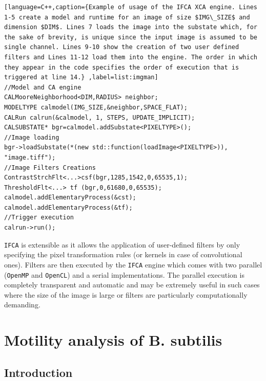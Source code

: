 \documentclass[conference]{IEEEtran}
\begin{document}
\lstset{
frame=single,
numberstyle=\ttfamily\footnotesize,
numbers=right
}
\begin{lstlisting}[language=C++,caption={Example of usage of the IFCA XCA engine. Lines 1-5 create a model and runtime for an image of size $IMG\_SIZE$ and dimension $DIM$. Lines 7 loads the image into the substate which, for the sake of brevity, is unique since the input image is assumed to be single channel. Lines 9-10 show the creation of two user defined filters and Lines 11-12 load them into the engine. The order in which they appear in the code specifies the order of execution that is triggered at line 14.} ,label=list:imgman]	
//Model and CA engine
CALMooreNeighborhood<DIM,RADIUS> neighbor;
MODELTYPE calmodel(IMG_SIZE,&neighbor,SPACE_FLAT);
CALRun calrun(&calmodel, 1, STEPS, UPDATE_IMPLICIT); 
CALSUBSTATE* bgr=calmodel.addSubstate<PIXELTYPE>();
//Image loading
bgr->loadSubstate(*(new std::function(loadImage<PIXELTYPE>)), "image.tiff");
//Image Filters Creations
ContrastStrchFlt<...>csf(bgr,1285,1542,0,65535,1);
ThresholdFlt<...> tf (bgr,0,61680,0,65535);
calmodel.addElementaryProcess(&cst);
calmodel.addElementaryProcess(&tf);
//Trigger execution
calrun->run();
\end{lstlisting}

\texttt{IFCA} is extensible as it allows the application of user-defined filters by only specifying the pixel transformation rules (or kernels in case of convolutional ones). 
Filters are then executed by the \texttt{IFCA} engine which comes with two parallel (\texttt{OpenMP} and \texttt{OpenCL})  and a serial implementations.
The parallel execution is completely transparent and automatic and may be extremely useful in such cases where the size of the image is large or filters are particularly computationally demanding.





\section{Motility analysis of B. subtilis}
\label{sect:bacteriaanalysis}
\subsection{Introduction}
\end{document}
